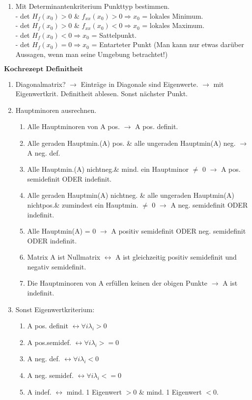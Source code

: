 \begin{enumerate}[leftmargin=0.5cm]
\begin{enumerate}[leftmargin=0.3cm]
		\item Mit Determinantenkriterium Punkttyp bestimmen.\\
		- det $H_f(x_0) > 0$ \& $f_{xx}(x_0) > 0 \Rightarrow x_0$ = lokales Minimum.\\
		- det $H_f(x_0) > 0$ \& $f_{xx}(x_0) < 0 \Rightarrow x_0$ = lokales Maximum.\\
		- det $H_f(x_0) < 0 \Rightarrow x_0$ = Sattelpunkt.\\
		- det $H_f(x_0) = 0 \Rightarrow x_0$ = Entarteter Punkt (Man kann nur etwas darüber Aussagen, wenn man seine Umgebung betrachtet!)
	\end{enumerate}
	$\textbf{Kochrezept Definitheit}$
	\begin{footnotesize}
		\begin{enumerate}
			\item Diagonalmatrix? $\rightarrow$ Einträge in Diagonale sind Eigenwerte. $\rightarrow$ mit Eigenwertkrit. Definitheit ablesen. Sonst nächster Punkt.
			\item Hauptminoren ausrechnen.
			\begin{enumerate}
			 \item Alle Hauptminoren von A pos. $\rightarrow$ A pos. definit. 
			 \item Alle geraden Hauptmin.(A) pos. \& alle ungeraden Hauptmin(A) neg. $\rightarrow$ A neg. def.
			 \item Alle Hauptmin.(A) nichtneg.\& mind. ein Hauptminor $\neq$ 0 $\rightarrow$ A pos. semidefinit ODER indefinit.
			 \item Alle geraden Hauptmin(A) nichtneg. \& alle ungeraden Hauptmin(A) nichtpos.\& zumindest ein Hauptmin. $\neq$ 0 $\rightarrow$ A neg. semidefinit ODER indefinit.
			 \item Alle Hauptmin(A) = 0 $\rightarrow$ A positiv semidefinit ODER neg. semidefinit ODER indefinit.
			 \item Matrix A ist Nullmatrix $\leftrightarrow$ A ist gleichzeitig positiv semidefinit und negativ semidefinit. 
			 \item Die Hauptminoren von A erfüllen keinen der obigen Punkte $\rightarrow$ A ist indefinit.  
			\end{enumerate}
			\item Sonst Eigenwertkriterium:
				\begin{enumerate}
					\item A pos. definit $\leftrightarrow \forall i \lambda _i > 0$
					\item A pos.semidef. $\leftrightarrow \forall i \lambda _i >= 0$
					\item A neg. def. $\leftrightarrow \forall i \lambda _i < 0$ 
					\item A neg. semidef. $\leftrightarrow \forall i \lambda _i <= 0$
					\item A indef. $\leftrightarrow$ mind. 1 Eigenwert $>0$ \& mind. 1 Eigenwert $<0$.
				\end{enumerate}
		\end{enumerate}
	\end{footnotesize}
		
\end{enumerate}

